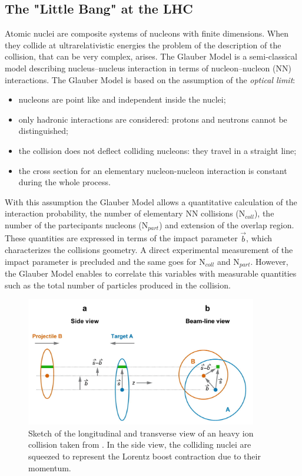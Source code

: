 \subsection{The "Little Bang" at the LHC}
\label{sec:1.3.1}

Atomic nuclei are composite systems of nucleons with finite dimensions. When they collide at 
ultrarelativistic energies the problem of the description of the collision, that can be very
complex, arises.
The Glauber Model \cite{glauber} is a semi-classical model describing nucleus–nucleus 
interaction in terms of nucleon–nucleon (NN) interactions.
The Glauber Model is based on the assumption of the \textit{optical limit}:
\begin{itemize}
    \item nucleons are point like and independent inside the nuclei;
    \item only hadronic interactions are considered: protons and neutrons cannot be distinguished;
    \item the collision does not deflect colliding nucleons: they travel in a straight line;
    \item the cross section for an elementary nucleon-nucleon interaction is constant during the whole 
    process.
\end{itemize}
With this assumption the Glauber Model allows a quantitative calculation of the interaction
probability, the number of elementary NN collisions ($\mathrm{N}_{coll}$), the number
of the partecipants nucleons ($\mathrm{N}_{part}$) and extension of the overlap region.
These quantities are expressed in terms of the impact parameter $\vec{b}$, which characterizes
the collisions geometry.
A direct experimental measurement of the impact parameter is precluded and the same goes for
$\mathrm{N}_{coll}$ and $\mathrm{N}_{part}$.
However, the Glauber Model enables to correlate this variables with measurable quantities
such as the total number of particles produced in the collision.

\begin{figure}[!h]
    \centering
    \includegraphics[width=0.9\textwidth]{gfx/glauber}
	\caption{Sketch of the longitudinal and transverse view of an heavy ion collision taken from \cite{glauber}. In the side view, the colliding nuclei are squeezed to represent the Lorentz boost contraction due to their momentum.}
	\label{fig:glauber}
\end{figure}

